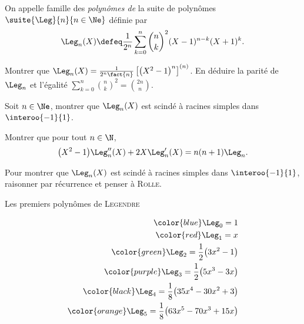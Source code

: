 \begin{defi}
    On appelle famille des \emph{polynômes de } la suite de polynômes $\suite{\Leg}{n}{n \in \Ne}$ définie par
    $$\Leg_n(X) \defeq \frac{1}{2^n} \sum_{k=0}^{n} \binom{n}{k}^2 (X-1)^{n-k}(X+1)^{k}.$$
\end{defi}


\begin{exercice}
    \begin{questions}
        \item Montrer que $\Leg_n(X) = \frac{1}{2^n \fact{n}} \left[ \big(X^2-1\big)^n \right]^{(n)}$. En déduire la parité de $\Leg_n$ et l'égalité $\sum\limits_{k=0}^n \binom{n}{k}^2 = \binom{2n}{n}$.
        \item Soit $n \in \Ne$, montrer que $\Leg_n(X)$ est scindé à racines simples dans $\interoo{-1}{1}$. 
        \item Montrer que pour tout $n \in \N$, $$\big(X^2-1\big) \Leg''_n(X) + 2X \Leg'_n(X) = n(n+1) \Leg_n.$$
    \end{questions}
\end{exercice}  

\begin{elemsolution}
    Pour montrer que $\Leg_n(X)$ est scindé à racines simples dans $\interoo{-1}{1}$, raisonner par récurrence et penser à \textsc{Rolle}. 
\end{elemsolution}

\begin{marginfigure}[-11.5cm]
    \centering
	
	\caption*{\centering Les premiers polynômes de \textsc{Legendre}}
	\small
	\begin{align*}
	    \color{blue} \Leg_0 = 1 \\
	    \color{red} \Leg_1 = x \\
	    \color{green} \Leg_2 = \frac{1}{2}\big(3x^2-1\big) \\
	    \color{purple} \Leg_3 = \frac{1}{2}\big(5x^3-3x\big) \\
	    \color{black} \Leg_4 = \frac{1}{8}\big(35x^4-30x^2+3\big) \\
	    \color{orange} \Leg_5 = \frac{1}{8}\big(63x^5-70x^3+15x\big)
	\end{align*}
\end{marginfigure}

